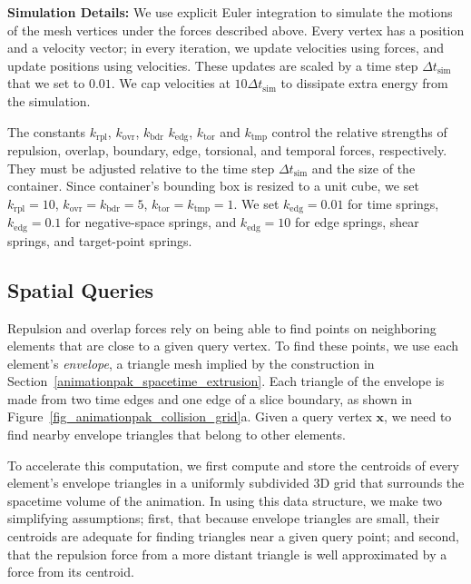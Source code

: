 \newtext
{
\textbf{Simulation Details:}
We use explicit Euler integration to simulate the motions of the mesh vertices under the
forces described above.  Every vertex has a position and a velocity vector; in
every iteration, we update velocities using forces, and update positions using
velocities.  These updates are scaled by a time step 
$\Delta t_\mathrm{sim}$ that we set to $0.01$.
We cap velocities at $10 \Delta t_\mathrm{sim}$ 
to dissipate extra energy from the simulation.
}

\newtext
{
The constants $k_\mathrm{rpl}$, $k_\mathrm{ovr}$, $k_\mathrm{bdr}$  $k_\mathrm{edg}$, $k_\mathrm{tor}$ 
and $k_\mathrm{tmp}$ control the relative strengths
of repulsion, overlap, boundary, edge, torsional, and temporal forces, respectively.
They must be adjusted relative to the time step $\Delta t_\mathrm{sim}$ and the size of the container.
Since container's bounding box is resized to a unit cube,
we set $k_\mathrm{rpl}=10$, $k_\mathrm{ovr}=k_\mathrm{bdr}=5$, $k_\mathrm{tor}=k_\mathrm{tmp}=1$.
We set $k_\mathrm{edg} = 0.01$ for time springs,
$k_\mathrm{edg} = 0.1$ for negative-space springs, and $k_\mathrm{edg} = 10$ for edge springs, shear springs,
and target-point springs.
}





\subsection{Spatial Queries}
\label{animationpak_spatial_queries}



Repulsion and overlap forces rely on being able to find points on
neighboring elements that are close to a given query vertex.
To find these points, we use each element's
\textit{envelope}, a triangle mesh implied by the construction in
Section~\ref{animationpak_spacetime_extrusion}.  Each triangle of the envelope 
is made from two time edges and one edge of a slice boundary, as
shown in Figure~\ref{fig_animationpak_collision_grid}a.  Given a query vertex 
$\bm{x}$, we need to find nearby envelope triangles that belong to
other elements.

To accelerate this computation, we first compute and store the centroids of
every element's envelope triangles in a uniformly subdivided 3D grid that
surrounds the spacetime volume of the animation.  In using this data
structure, we make two simplifying assumptions; first, that because 
envelope triangles are small, their centroids
are adequate for finding triangles near a given query point; and second,
that the repulsion force from a more distant triangle is well approximated
by a force from its centroid.

